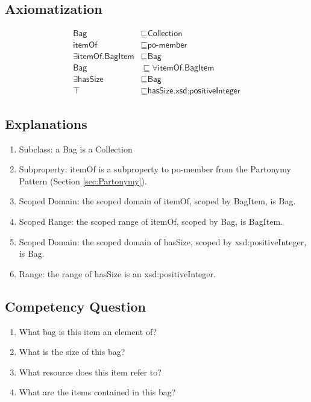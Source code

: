\subsection{Axiomatization}
\label{axs:Aggregation,}
\begin{align}
\textsf{Bag} &\sqsubseteq \textsf{Collection} \\
\textsf{itemOf} &\sqsubseteq \textsf{po-member} \\
\exists\textsf{itemOf.BagItem} &\sqsubseteq \textsf{Bag} \\
\textsf{Bag} &\sqsubseteq \forall\textsf{itemOf.BagItem} \\
\exists\textsf{hasSize} &\sqsubseteq \textsf{Bag} \\
\top &\sqsubseteq \textsf{hasSize.xsd:positiveInteger}
\end{align}

\subsection{Explanations}
\label{exp:Aggregation,}
\begin{enumerate}
\item Subclass: a \textsf{Bag} is a \textsf{Collection}
\item Subproperty: \textsf{itemOf} is a subproperty to \textsf{po-member} from the Partonymy Pattern (Section \ref{sec:Partonymy}).
\item Scoped Domain: the scoped domain of \textsf{itemOf}, scoped by \textsf{BagItem}, is \textsf{Bag}.
\item Scoped Range: the scoped range of \textsf{itemOf}, scoped by \textsf{Bag}, is \textsf{BagItem}.
\item Scoped Domain: the scoped domain of \textsf{hasSize}, scoped by \textsf{xsd:positiveInteger}, is \textsf{Bag}.
\item Range: the range of \textsf{hasSize} is an \textsf{xsd:positiveInteger}.
\end{enumerate}

\subsection{Competency Question}
\label{cqs:Aggregation,}
\begin{enumerate}[CQ1.]
\item What bag is this item an element of?
\item What is the size of this bag?
\item What resource does this item refer to?
\item What are the items contained in this bag?
\end{enumerate}

\newpage

